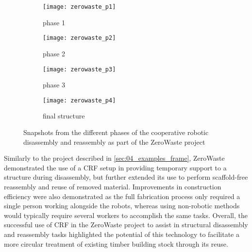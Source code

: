     \begin{figure}[H]
        \centering
        \begin{subfigure}{.49\textwidth}
            \centering
            \texttt{[image: zerowaste\_p1]}
            \caption{phase 1}
        \end{subfigure}
        \begin{subfigure}{.49\textwidth}
            \centering
            \texttt{[image: zerowaste\_p2]}
            \caption{phase 2}
        \end{subfigure}

        \begin{subfigure}{.49\textwidth}
            \centering
            \texttt{[image: zerowaste\_p3]}
            \caption{phase 3}
        \end{subfigure}
        \begin{subfigure}{.49\textwidth}
            \centering
            \texttt{[image: zerowaste\_p4]}
            \caption{final structure}
        \end{subfigure}
        \caption{Snapshots from the different phases of the cooperative robotic disassembly and reassembly as part of the ZeroWaste project}
        \label{fig:zerowaste}
    \end{figure}   

    Similarly to the project described in \cref{sec:04_examples_frame}, ZeroWaste demonstrated the use of a CRF setup in providing temporary support to a structure during disassembly, but further extended its use to perform scaffold-free reassembly and reuse of removed material. Improvements in construction efficiency were also demonstrated as the full fabrication process only required a single person working alongside the robots, whereas using non-robotic methods would typically require several workers to accomplish the same tasks. Overall, the successful use of CRF in the ZeroWaste project to assist in structural disassembly and reassembly tasks highlighted the potential of this technology to facilitate a more circular treatment of existing timber building stock through its reuse.


